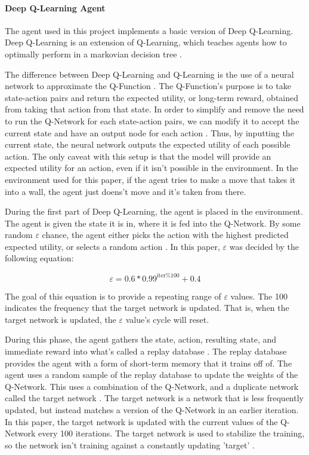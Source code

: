 \documentclass[12pt,letterpaper]{article}
\begin{document}
\paragraph{Deep Q-Learning Agent}

The agent used in this project implements a basic version of Deep Q-Learning.
Deep Q-Learning is an extension of Q-Learning, which teaches agents how to optimally perform in a markovian decision tree \cite{article_q_learning}.

The difference between Deep Q-Learning and Q-Learning is the use of a neural network to approximate the Q-Function \cite{article_human_level_control_deep_reinforcement_learning}.
The Q-Function's purpose is to take state-action pairs and return the expected utility, or long-term reward, obtained from taking that action from that state.
In order to simplify and remove the need to run the Q-Network for each state-action pairs, we can modify it to accept the current state and have an output node for each action \cite{article_reinforcement_learning_survey}.
Thus, by inputting the current state, the neural network outputs the expected utility of each possible action.
The only caveat with this setup is that the model will provide an expected utility for an action, even if it isn't possible in the environment.
In the environment used for this paper, if the agent tries to make a move that takes it into a wall, the agent just doens't move and it's taken from there.

During the first part of Deep Q-Learning, the agent is placed in the environment.
The agent is given the state it is in, where it is fed into the Q-Network.
By some random $\varepsilon$ chance, the agent either picks the action with the highest predicted expected utility, or selects a random action \cite{article_reinforcement_learning_survey}.
In this paper, $\varepsilon$ was decided by the following equation:

$$\varepsilon = 0.6 * 0.99^{\text{iter} \% 100} + 0.4$$

The goal of this equation is to provide a repeating range of $\varepsilon$ values.
The 100 indicates the frequency that the target network is updated.
That is, when the target network is updated, the $\varepsilon$ value's cycle will reset.

During this phase, the agent gathers the state, action, resulting state, and immediate reward into what's called a replay database \cite{article_reinforcement_learning_for_robots}.
The replay database provides the agent with a form of short-term memory that it trains off of.
The agent uses a random sample of the replay database to update the weights of the Q-Network.
This uses a combination of the Q-Network, and a duplicate network called the target network \cite{article_human_level_control_deep_reinforcement_learning}.
The target network is a network that is less frequently updated, but instead matches a version of the Q-Network in an earlier iteration.
In this paper, the target network is updated with the current values of the Q-Network every 100 iterations.
The target network is used to stabilize the training, so the network isn't training against a constantly updating 'target' \cite{article_human_level_control_deep_reinforcement_learning}.
\end{document}
